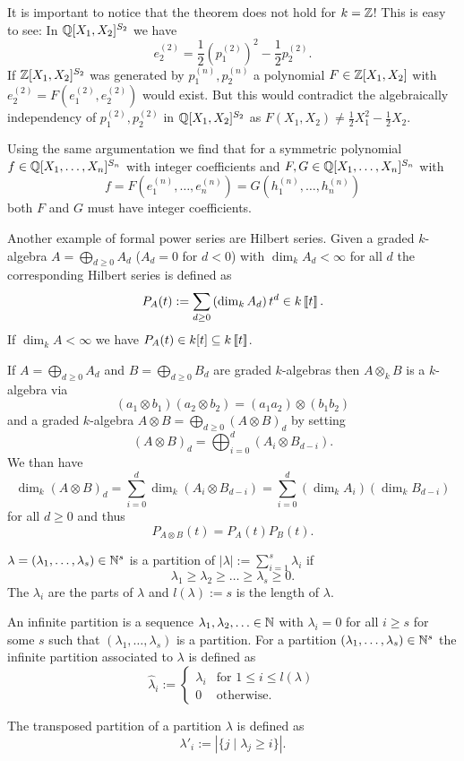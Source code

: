 It is important to notice that the theorem does not hold for $k = \mathbb{Z}$! This is easy to see: In $\mathbb{Q}[X_1, X_2]^{S_2}$ we have
\[
 e^{(2)}_2 = \frac{1}{2}\left(p^{(2)}_1\right)^2 - \frac{1}{2} p^{(2)}_2.
\]
If $\mathbb{Z}[X_1, X_2]^{S_2}$ was generated by $p^{(n)}_1, p^{(n)}_2$ a polynomial $F \in \mathbb{Z}[X_1, X_2]$ with $e^{(2)}_2 = F\left(e^{(2)}_1, e^{(2)}_2\right)$ would exist. But this would contradict the algebraically independency of $p^{(2)}_1, p^{(2)}_2$ in $\mathbb{Q}[X_1, X_2]^{S_2}$ as $F(X_1, X_2) \neq \frac{1}{2} X_1^2 - \frac{1}{2} X_2$.


Using the same argumentation we find that for a symmetric polynomial $f \in \mathbb{Q}[X_1, \ldots, X_n]^{S_n}$ with integer coefficients and $F,G \in \mathbb{Q}[X_1, \ldots, X_n]^{S_n}$ with
\[
 f = F\left( e^{(n)}_1, \ldots, e^{(n)}_n \right) = G\left( h^{(n)}_1, \ldots, h^{(n)}_n\right)
\]
both $F$ and $G$ must have integer coefficients.


\begin{expl}
 Another example of formal power series are Hilbert series. Given a graded $k$-algebra $A = \bigoplus_{d \geq 0} A_d$ ($A_d = 0$ for $d < 0$) with $\dim_k A_d < \infty$ for all $d$ the corresponding Hilbert series is defined as
 \[
  P_A(t) := \sum_{d \geq 0} \left( \dim_k A_d \right) t^d \in k\left[\!\left[t\right]\!\right].
 \]
 If $\dim_k A < \infty$ we have $P_A(t) \in k[t] \subseteq k\left[\!\left[t\right]\!\right]$.
 
 If $A = \bigoplus_{d \geq 0} A_d$ and $B = \bigoplus_{d \geq 0} B_d$ are graded $k$-algebras then $A \otimes_k B$ is a $k$-algebra via
 \[
  (a_1 \otimes b_1) (a_2 \otimes b_2) = (a_1 a_2) \otimes (b_1 b_2)
 \]
 and a graded $k$-algebra $A \otimes B = \bigoplus_{d \geq 0} (A \otimes B)_d$ by setting
 \[
  (A \otimes B)_d = \bigoplus_{i=0}^d (A_i \otimes B_{d-i}).
 \]
 We than have
 \[
  \dim_k (A \otimes B)_d = \sum_{i=0}^d \dim_k (A_i \otimes B_{d-i}) = \sum_{i=0}^d (\dim_k A_i) (\dim_k B_{d-i})
 \]
 for all $d \geq 0$ and thus
 \[
  P_{A \otimes B}(t) = P_A(t) P_B(t).
 \]
\end{expl}



\begin{defi}
 $\lambda = (\lambda_1, \ldots, \lambda_s) \in \mathbb{N}^s$ is a partition of $|\lambda| := \sum_{i=1}^s \lambda_i$ if
 \[
  \lambda_1 \geq \lambda_2 \geq \ldots \geq \lambda_s \geq 0.
 \]
 The $\lambda_i$ are the parts of $\lambda$ and $l(\lambda) := s$ is the length of  $\lambda$.
 
 An infinite partition is a sequence $\lambda_1, \lambda_2, \ldots \in \mathbb{N}$ with $\lambda_i = 0$ for all $i \geq s$ for some $s$ such that $(\lambda_1, \ldots, \lambda_s)$ is a partition. For a partition $(\lambda_1, \ldots, \lambda_s) \in \mathbb{N}^s$ the infinite partition associated to $\lambda$ is defined as
 \[
  \hat{\lambda}_i :=
  \begin{cases}
   \lambda_i & \text{for } 1 \leq i \leq l(\lambda) \\
           0 & \text{otherwise}.
  \end{cases}
 \]
 
 The transposed partition of a partition $\lambda$ is defined as
 \[
  \lambda'_i := |\{j \mid \lambda_j \geq i\}|.
 \]
\end{defi}

